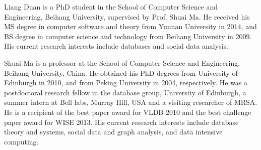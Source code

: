 \vspace{-8ex}
\begin{IEEEbiography}{Liang Duan} is a PhD student in the School of Computer Science and Engineering, Beihang University, supervised by Prof. Shuai Ma. He received his MS degree in computer software and theory from Yunnan University in 2014, and BS degree in computer science and technology from Beihang University in 2009. His current research interests include databases and social data analysis.
\end{IEEEbiography}
\vspace{-8ex}
\begin{IEEEbiography}{Shuai Ma} is a professor at the School of Computer Science and Engineering, Beihang University, China.
He obtained his PhD degrees from University of Edinburgh in 2010, and from
Peking University in 2004, respectively.
He was a postdoctoral research fellow in the database group, University of Edinburgh, a summer intern at Bell labs, Murray Hill, USA and a visiting researcher of MRSA.
He is a recipient of the best paper award for VLDB 2010 and the best challenge paper award for WISE 2013. His current research interests include database theory and systems, social data and graph analysis, and data intensive computing.
\end{IEEEbiography}
\vspace{-8ex}
